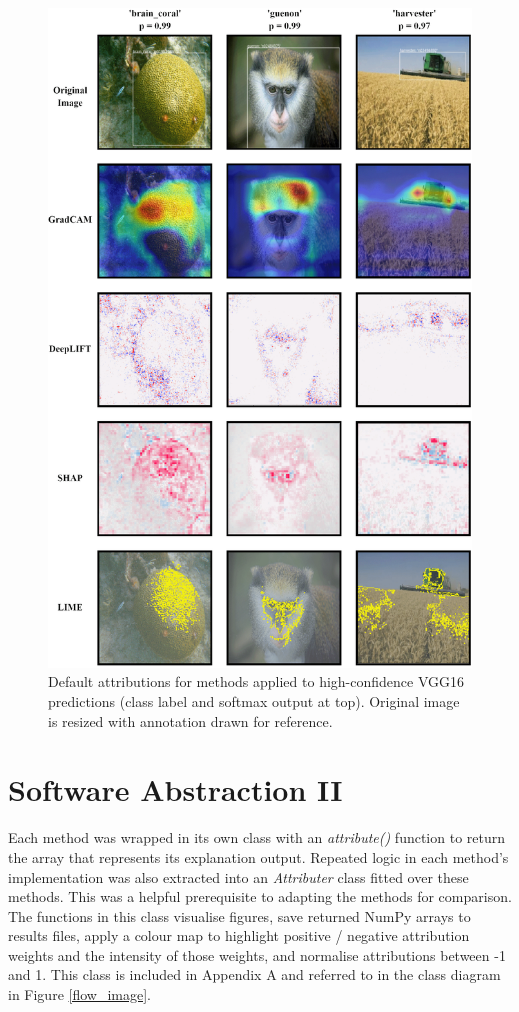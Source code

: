 \documentclass[main]{subfiles}
\begin{document}
\begin{figure}[htbp]
\centering
\includegraphics[scale=0.28]{method_box.png}
\caption{Default attributions for methods applied to high-confidence VGG16 predictions (class label and softmax output at top). Original image is resized with annotation drawn for reference. }
\label{defaultimg}
\end{figure}

\section{Software Abstraction II}  \label{sec:sw2}

Each method was wrapped in its own class with an \textit{attribute()} function to return the array that represents its explanation output. Repeated logic in each method's implementation was also extracted into an \textit{Attributer} class fitted over these methods. This was a helpful prerequisite to adapting the methods for comparison. The functions in this class visualise figures, save returned NumPy arrays to results files, apply a colour map to highlight positive / negative attribution weights and the intensity of those weights, and normalise attributions between -1 and 1. This class is included in Appendix A and referred to in the class diagram in Figure \ref{flow_image}.
\end{document}

